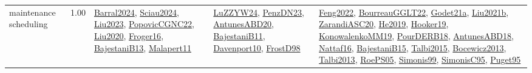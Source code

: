 {\begin{longtable}{p{3cm}r>{\raggedright\arraybackslash}p{6cm}>{\raggedright\arraybackslash}p{6cm}>{\raggedright\arraybackslash}p{8cm}}
\index{maintenance scheduling}\index{ApplicationAreas!maintenance scheduling}maintenance scheduling &  1.00 & \hyperref[detail:Barral2024]{Barral2024}, \hyperref[detail:Sciau2024]{Sciau2024}, \hyperref[detail:Liu2023]{Liu2023}, \hyperref[detail:PopovicCGNC22]{PopovicCGNC22}, \hyperref[detail:Liu2020]{Liu2020}, \hyperref[detail:Froger16]{Froger16}, \hyperref[detail:BajestaniB13]{BajestaniB13}, \hyperref[detail:Malapert11]{Malapert11} & \hyperref[detail:LuZZYW24]{LuZZYW24}, \hyperref[detail:PenzDN23]{PenzDN23}, \hyperref[detail:AntunesABD20]{AntunesABD20}, \hyperref[detail:BajestaniB11]{BajestaniB11}, \hyperref[detail:Davenport10]{Davenport10}, \hyperref[detail:FrostD98]{FrostD98} & \hyperref[detail:Feng2022]{Feng2022}, \hyperref[detail:BourreauGGLT22]{BourreauGGLT22}, \hyperref[detail:Godet21a]{Godet21a}, \hyperref[detail:Liu2021b]{Liu2021b}, \hyperref[detail:ZarandiASC20]{ZarandiASC20}, \hyperref[detail:He2019]{He2019}, \hyperref[detail:Hooker19]{Hooker19}, \hyperref[detail:KonowalenkoMM19]{KonowalenkoMM19}, \hyperref[detail:PourDERB18]{PourDERB18}, \hyperref[detail:AntunesABD18]{AntunesABD18}, \hyperref[detail:Nattaf16]{Nattaf16}, \hyperref[detail:BajestaniB15]{BajestaniB15}, \hyperref[detail:Talbi2015]{Talbi2015}, \hyperref[detail:Bocewicz2013]{Bocewicz2013}, \hyperref[detail:Talbi2013]{Talbi2013}, \hyperref[detail:RoePS05]{RoePS05}, \hyperref[detail:Simonis99]{Simonis99}, \hyperref[detail:SimonisC95]{SimonisC95}, \hyperref[detail:Puget95]{Puget95}\\

\end{longtable}}
